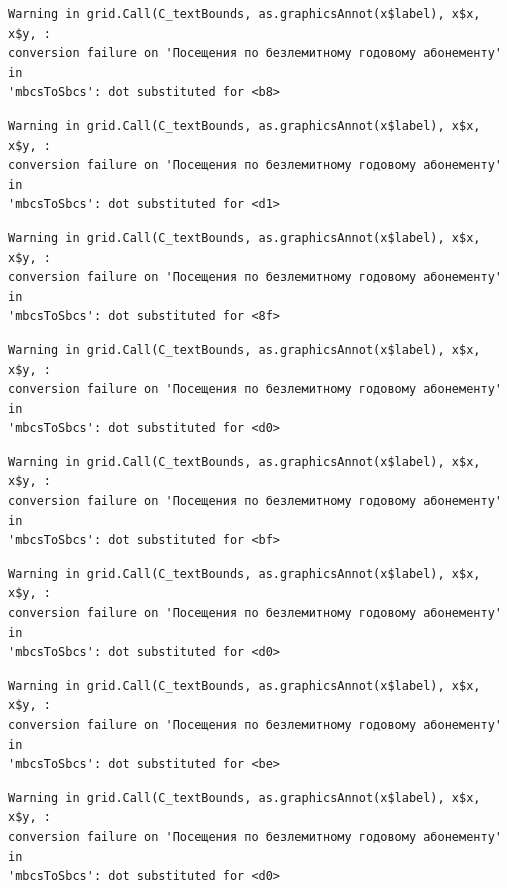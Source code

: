 \documentclass[
  letterpaper,
  DIV=11,
  numbers=noendperiod]{scrartcl}
\begin{document}
\begin{verbatim}
Warning in grid.Call(C_textBounds, as.graphicsAnnot(x$label), x$x, x$y, :
conversion failure on 'Посещения по безлемитному годовому абонементу' in
'mbcsToSbcs': dot substituted for <b8>
\end{verbatim}

\begin{verbatim}
Warning in grid.Call(C_textBounds, as.graphicsAnnot(x$label), x$x, x$y, :
conversion failure on 'Посещения по безлемитному годовому абонементу' in
'mbcsToSbcs': dot substituted for <d1>
\end{verbatim}

\begin{verbatim}
Warning in grid.Call(C_textBounds, as.graphicsAnnot(x$label), x$x, x$y, :
conversion failure on 'Посещения по безлемитному годовому абонементу' in
'mbcsToSbcs': dot substituted for <8f>
\end{verbatim}

\begin{verbatim}
Warning in grid.Call(C_textBounds, as.graphicsAnnot(x$label), x$x, x$y, :
conversion failure on 'Посещения по безлемитному годовому абонементу' in
'mbcsToSbcs': dot substituted for <d0>
\end{verbatim}

\begin{verbatim}
Warning in grid.Call(C_textBounds, as.graphicsAnnot(x$label), x$x, x$y, :
conversion failure on 'Посещения по безлемитному годовому абонементу' in
'mbcsToSbcs': dot substituted for <bf>
\end{verbatim}

\begin{verbatim}
Warning in grid.Call(C_textBounds, as.graphicsAnnot(x$label), x$x, x$y, :
conversion failure on 'Посещения по безлемитному годовому абонементу' in
'mbcsToSbcs': dot substituted for <d0>
\end{verbatim}

\begin{verbatim}
Warning in grid.Call(C_textBounds, as.graphicsAnnot(x$label), x$x, x$y, :
conversion failure on 'Посещения по безлемитному годовому абонементу' in
'mbcsToSbcs': dot substituted for <be>
\end{verbatim}

\begin{verbatim}
Warning in grid.Call(C_textBounds, as.graphicsAnnot(x$label), x$x, x$y, :
conversion failure on 'Посещения по безлемитному годовому абонементу' in
'mbcsToSbcs': dot substituted for <d0>
\end{verbatim}
\end{document}
